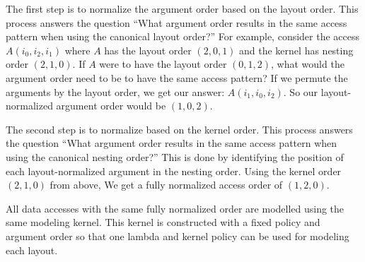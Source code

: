 The first step is to normalize the argument order based on the layout order.
This process answers the question ``What argument order results in the same access pattern when using the canonical layout order?''
For example, consider the access $A(i_0,i_2,i_1)$ where $A$ has the layout order $(2,0,1)$ and the kernel has nesting order $(2,1,0)$.
If $A$ were to have the layout order $(0,1,2)$, what would the argument order need to be to have the same access pattern? 
If we permute the arguments by the layout order, we get our answer: $A(i_1, i_0, i_2)$.
So our layout-normalized argument order would be $(1,0,2)$. 

The second step is to normalize based on the kernel order. 
This process answers the question ``What argument order results in the same access pattern when using the canonical nesting order?''
This is done by identifying the position of each layout-normalized argument in the nesting order. 
Using the kernel order $(2,1,0)$ from above, We get a fully normalized access order of $(1,2,0)$.

All data accesses with the same fully normalized order are modelled using the same modeling kernel. 
This kernel is constructed with a fixed policy and argument order so that one lambda and kernel policy can be used for modeling each layout. 


